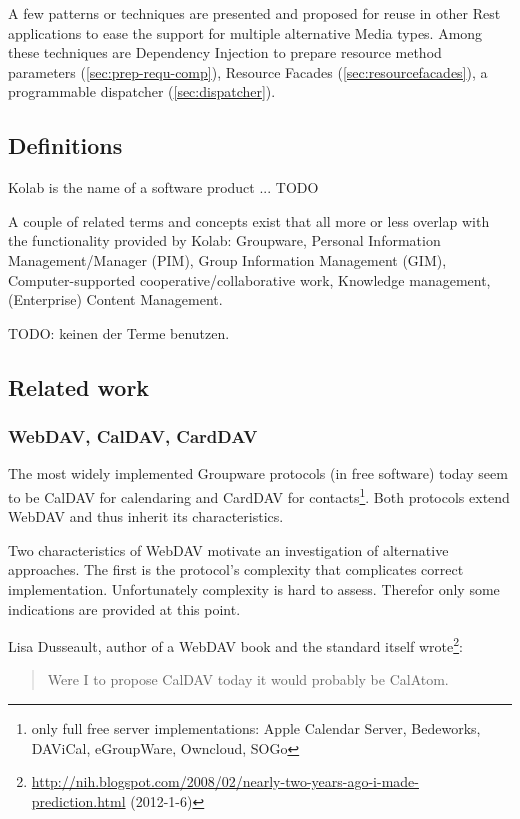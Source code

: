 \documentclass[12pt,a4paper]{scrartcl}		%
\newcommand{\citeurl}[2]{\url{#1} (#2)}
\begin{document}
A few patterns or techniques are presented and proposed for reuse in other Rest
applications to ease the support for multiple alternative Media types. Among
these techniques are Dependency Injection to prepare resource method parameters
(\autoref{sec:prep-requ-comp}), Resource Facades
  (\autoref{sec:resourcefacades}), a programmable dispatcher
  (\autoref{sec:dispatcher}).

\subsection{Definitions}
Kolab is the name of a software product ... TODO

A couple of related terms and concepts exist that all more or less overlap with
the functionality provided by Kolab: Groupware, Personal Information
Management/Manager (PIM), Group Information Management (GIM), Computer-supported
cooperative/collaborative work, Knowledge management, (Enterprise) Content
Management.

TODO: keinen der Terme benutzen.

\subsection{Related work}
\subsubsection{WebDAV, CalDAV, CardDAV}

The most widely implemented Groupware protocols (in free software) today seem to
be CalDAV\cite{RFC4791} for calendaring and CardDAV\cite{RFC6352} for
contacts\footnote{only full free server implementations: Apple Calendar Server,
  Bedeworks, DAViCal, eGroupWare, Owncloud, SOGo}. Both protocols extend
WebDAV\cite{RFC4918} and thus inherit its characteristics.

Two characteristics of WebDAV motivate an investigation of alternative
approaches. The first is the protocol's complexity that complicates correct
implementation. Unfortunately complexity is hard to assess. Therefor only some
indications are provided at this point.

Lisa Dusseault, author of a WebDAV book\cite{Dusseault2004} and the standard
itself
wrote\footnote{\citeurl{http://nih.blogspot.com/2008/02/nearly-two-years-ago-i-made-prediction.html}{2012-1-6}}:

\begin{quote}
Were I to propose CalDAV today it would probably be CalAtom.
\end{quote}
\end{document}
